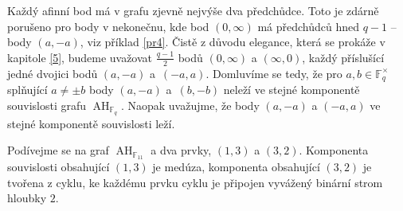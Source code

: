 \documentclass[12pt]{report}
\DeclareMathOperator{\AH}{AH}
\begin{document}
\begin{umluva}
Každý afinní bod má v grafu zjevně nejvýše dva předchůdce. Toto je zdárně porušeno pro body v nekonečnu, kde bod $(0,\infty)$ má předchůdců hned $q-1$ -- body $(a,-a)$, viz příklad \ref{pr4}. Čistě z důvodu elegance, která se prokáže v kapitole \ref{5}, budeme uvažovat $\frac{q-1}{2}$ bodů $(0,\infty)$ a $(\infty,0)$, každý příslušící jedné dvojici bodů $(a,-a)$ a~$(-a,a)$. Domluvíme se tedy, že pro $a,b \in \mathbb{F}_q ^{\times}$ splňující $a \neq \pm b$ body $(a,-a)$ a~$(b,-b)$ neleží ve stejné komponentě souvislosti grafu $\AH_{\mathbb{F}_q}$. Naopak uvažujme, že body $(a,-a)$ a $(-a,a)$ ve stejné komponentě souvislosti leží.
\end{umluva}

\begin{priklad}\label{pr4}
Podívejme se na graf $\AH_{\mathbb{F}_{11}}$ a dva prvky, $(1,3)$ a $(3,2)$. Komponenta souvislosti obsahující $(1,3)$ je medúza, komponenta obsahující $(3,2)$ je tvořena z cyklu, ke každému prvku cyklu je připojen vyvážený binární strom hloubky $2$. 

 
\begin{figure}[!h]
\begin{minipage}{0.5\textwidth}
\centering
\end{minipage}
\end{figure}
\end{priklad}
\end{document}
